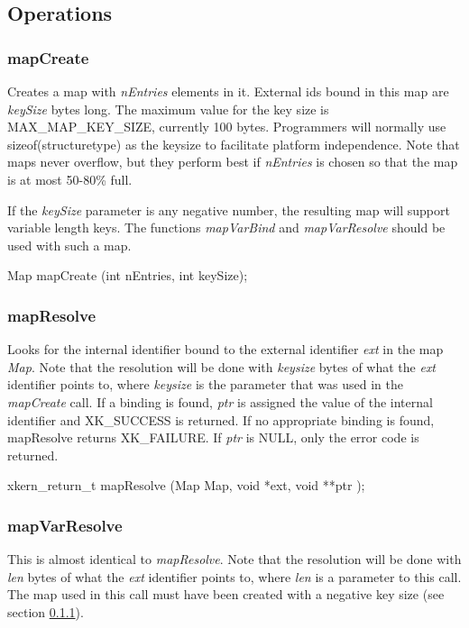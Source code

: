 \subsection{Operations}

\subsubsection{mapCreate}
\label{mapcreate}
Creates a map with {\em nEntries} elements in it. External ids bound
in this map are {\em keySize} bytes long. The maximum value for the
key size is MAX\_MAP\_KEY\_SIZE, currently 100 bytes.  Programmers will
normally use {\sf sizeof(structuretype)} as the keysize to facilitate
platform independence.  Note that maps never overflow, but they
perform best if {\em nEntries} is chosen so that the map is at most
50-80\% full.

If the {\em keySize} parameter is any negative number, the resulting map will
support variable length keys.  The functions {\em mapVarBind} and
{\em mapVarResolve} should be used with such a map.

\medskip

{\sem Map } {\bold mapCreate} ({\sem int} {\caps nEntries}, {\sem int} {\caps keySize});

\subsubsection{mapResolve}

Looks for the internal identifier bound to the external identifier
{\em ext} in the map {\em Map}.  Note that the resolution will be done
with {\em keysize} bytes of what the {\em ext} identifier points to,
where {\em keysize} is the parameter that was used in the {\em
mapCreate} call.  If a binding is found, {\em *ptr} is assigned the
value of the internal identifier and XK\_SUCCESS is returned.  If no
appropriate binding is found, mapResolve returns XK\_FAILURE.  If {\em
ptr} is NULL, only the error code is returned.
\medskip

{\sem xkern\_return\_t} {\bold mapResolve} ({\sem Map} {\caps Map}, 
{\sem void} *{\caps ext}, 
{\sem void} **{\caps ptr} );

\subsubsection{mapVarResolve}

This is almost identical to {\em mapResolve}.  Note that the
resolution will be done with {\em len} bytes of what the {\em ext}
identifier points to, where {\em len} is a parameter to this call.
The map used in this call must have been created with a negative
key size (see section \ref{mapcreate}).
\medskip

